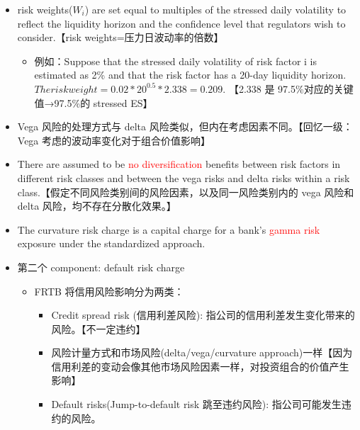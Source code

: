 \begin{itemize}
\begin{itemize}
\item risk weights($W_i$) are set equal to multiples of the stressed daily volatility to reflect the liquidity horizon and the confidence level that regulators wish to consider.【risk weights=压力日波动率的倍数】
    \begin{itemize}
    \item 例如：Suppose that the stressed daily volatility of risk factor i is estimated as 2\% and that the risk factor has a 20-day liquidity horizon. $The risk weight = 0.02* 20^{0.5} *2.338 = 0.209.$ 【2.338 是 97.5\%对应的关键值→97.5\%的 stressed ES】

    \end{itemize}
\end{itemize}


\begin{itemize}

\item[B.] Vega 风险的处理方式与 delta 风险类似，但内在考虑因素不同。【回忆一级：Vega 考虑的波动率变化对于组合价值影响】
    
\item There are assumed to be \textcolor{red}{no diversification} benefits between risk factors in different risk classes and between the vega risks and delta risks within a risk class.【假定不同风险类别间的风险因素，以及同一风险类别内的 vega 风险和 delta 风险，均不存在分散化效果。】
\end{itemize}
\begin{itemize}

\item[C.] The curvature risk charge is a capital charge for a bank's \textcolor{red}{gamma risk} exposure under the standardized approach.
    
\item 第二个 component: default risk charge
    \begin{itemize}
    \item FRTB 将信用风险影响分为两类：
        \begin{itemize}
        \item Credit spread risk (信用利差风险): 指公司的信用利差发生变化带来的风险。【不一定违约】
            
            \item 风险计量方式和市场风险(delta/vega/curvature approach)一样【因为信用利差的变动会像其他市场风险因素一样，对投资组合的价值产生影响】
            
        \item Default risks(Jump-to-default risk 跳至违约风险): 指公司可能发生违约的风险。
            

\end{itemize}
\end{itemize}
\end{itemize}
\end{itemize}
